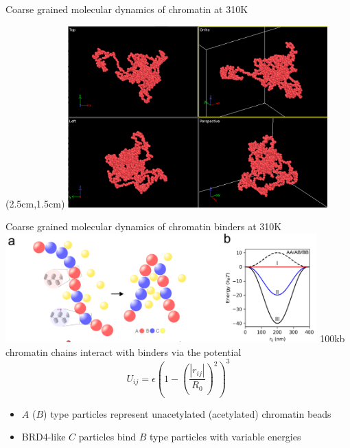\documentclass{beamer}					%
\begin{document}
\begin{frame}{Coarse grained molecular dynamics of chromatin at 310K}
\begin{textblock*}{10cm}(2.5cm,1.5cm)
\includegraphics[width=10cm]{../../brd4/brd4/media/Rouse}
\end{textblock*}
\end{frame}

\begin{frame}{Coarse grained molecular dynamics of chromatin binders at 310K}
\includegraphics[width=12cm]{../../brd4/brd4/media/MD-1}
100kb chromatin chains interact with binders via the potential 
\begin{equation*}
U_{ij} = \epsilon \left(1-\left(\frac{|r_{ij}|}{R_{0}}\right)^{2}\right)^{3}
\end{equation*}
\begin{itemize}
\item $A$ ($B$) type particles represent unacetylated (acetylated) chromatin beads
\item BRD4-like $C$ particles bind $B$ type particles with variable energies
\end{itemize}
\end{frame}
\end{document}
